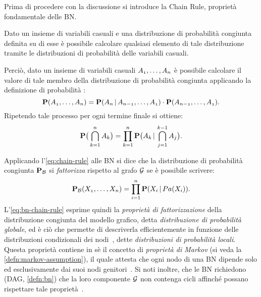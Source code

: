 Prima di procedere con la discussione si introduce la Chain Rule, proprietà fondamentale delle \acs{BN}.

\begin{teorema}
Dato un insieme di variabili casuali e una distribuzione di probabilità congiunta definita su di esse è possibile calcolare qualsiasi elemento di tale distribuzione tramite le distribuzioni di probabilità \cond*{} delle variabili casuali.
\end{teorema}

Perciò, dato un insieme di variabili casuali $\mathnormal{A_1},\dotsc,\mathnormal{A_n}$ è possibile calcolare il valore di tale membro della distribuzione di probabilità congiunta applicando la definizione di probabilità \cond*{}:
\[
\mathbf{P}(\mathnormal{A_1},\dotsc,\mathnormal{A_n})=\mathbf{P}(\mathnormal{A_n}\,\arrowvert\,\mathnormal{A_{n-1}},\dotsc,\mathnormal{A_1})\cdot\mathbf{P}(\mathnormal{A_{n-1}},\dotsc,\mathnormal{A_1})\text{.}
\]
Ripetendo tale processo per ogni termine finale si ottiene:
\begin{equation}
\label{eq:chain-rule}
\mathbf{P}\big(\bigcap_{k=1}^{n}\mathnormal{A_k}\big)=\prod_{k=1}^{n}\mathbf{P}\big(\mathnormal{A_k}\,\arrowvert\,\bigcap_{j=1}^{k-1}\mathnormal{A_j}\big)\text{.}
\end{equation}

Applicando l'\autoref{eq:chain-rule} alle \acl{BN} si dice che la distribuzione di probabilità congiunta $\mathbf{P}_{\mathcal{B}}$ si \emph{fattorizza} rispetto al grafo $\mathcal{G}$ se è possibile scrivere:
\begin{equation}\label{eq:bn-chain-rule}
\mathbf{P}_{\mathcal{B}}(\mathnormal{X_1}, \dotsc, \mathnormal{X_n})=\prod_{i=1}^{n}\mathbf{P}(\mathnormal{X_i}\,\arrowvert\,Pa(\mathnormal{X_i}))\text{.}
\end{equation}
L'\autoref{eq:bn-chain-rule} esprime quindi la \emph{proprietà di fattorizzazione} della distribuzione congiunta del modello grafico, detta \emph{distribuzione di probabilità globale}, ed è ciò che permette di descriverla efficientemente in funzione delle distribuzioni condizionali dei nodi~\citep[][sezione 14.2]{Russel2003}, dette \emph{distribuzioni di probabilità locali}. Questa proprietà contiene in sè il concetto di \emph{proprietà di Markov} (si veda la \autoref{defn:markov-assumption}), il quale attesta che ogni nodo di una \acl{BN} dipende solo ed esclusivamente dai suoi nodi genitori~\citep[][sezione 2.2.4]{Korb2011}. Si noti inoltre, che le \acl{BN} richiedono (\acs{DAG}, \autoref{defn:bn}) che la loro componente $\mathcal{G}$ non contenga cicli  affinché possano rispettare tale proprietà~\citep[][sezione 14.1]{Russel2003}.

